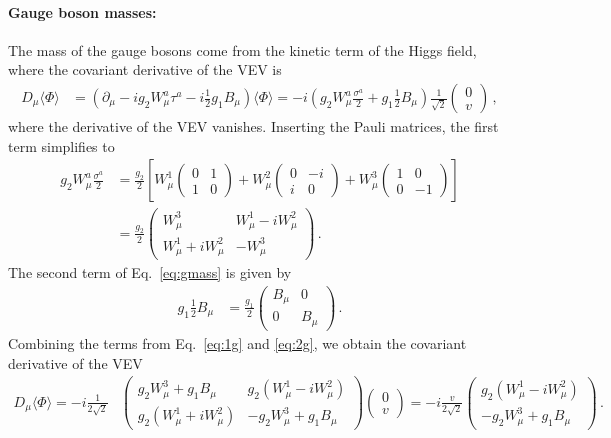 \paragraph{Gauge boson masses: } The mass of the gauge bosons come from the kinetic term of the Higgs field, where the covariant derivative of the VEV is 
\begin{align}
D_\mu \langle\Phi\rangle &= \left( \partial_\mu - i g_2 W_\mu^a \tau^a - i \frac{1}{2} g_1 B_\mu \right) \langle\Phi\rangle = -i \left( g_2 W_\mu^a \frac{\sigma^a}{2} + g_1 \frac{1}{2} B_\mu \right) \frac{1}{\sqrt{2}} \begin{pmatrix} 0 \\ v \end{pmatrix} \,,\label{eq:gmass}
\end{align}
where the derivative of the VEV vanishes. Inserting the Pauli matrices, the first term simplifies to
\begin{align}
    g_2 W_\mu^a \frac{\sigma^a}{2} &= \frac{g_2}{2} \left[ W_\mu^1 \begin{pmatrix} 0 & 1 \\ 1 & 0 \end{pmatrix} + W_\mu^2 \begin{pmatrix} 0 & -i \\ i & 0 \end{pmatrix} + W_\mu^3 \begin{pmatrix} 1 & 0 \\ 0 & -1 \end{pmatrix} \right]\nonumber \\
&= \frac{g_2}{2} \begin{pmatrix} W_\mu^3 & W_\mu^1 - i W_\mu^2 \\ W_\mu^1 + i W_\mu^2 & -W_\mu^3 \end{pmatrix} \,.\label{eq:1g}
\end{align}
The second term of Eq.~\eqref{eq:gmass} is given by
\begin{align}
    g_1 \frac{1}{2} B_\mu &= \frac{g_1}{2} \begin{pmatrix} B_\mu & 0 \\ 0 & B_\mu \end{pmatrix} \,.\label{eq:2g}
\end{align}
Combining the terms from Eq.~\eqref{eq:1g} and \eqref{eq:2g}, we obtain the covariant derivative of the VEV 
\begin{align}
   D_\mu \langle\Phi\rangle= -i \frac{1}{2\sqrt{2}} &\begin{pmatrix} g_2 W_\mu^3 + g_1 B_\mu & g_2 (W_\mu^1 - i W_\mu^2) \\ g_2 (W_\mu^1 + i W_\mu^2) & -g_2 W_\mu^3 + g_1 B_\mu \end{pmatrix} \begin{pmatrix} 0 \\ v \end{pmatrix} = -i \frac{v}{2\sqrt{2}} \begin{pmatrix} g_2 (W_\mu^1 - i W_\mu^2) \\ -g_2 W_\mu^3 + g_1 B_\mu \end{pmatrix}\,.
\end{align}
